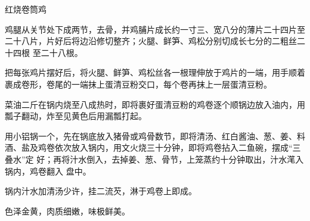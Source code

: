 %
%
%
%
%
%
%
\begin{recipe}{红烧卷筒鸡}

\ingredients


\preparation

\step 鸡腿从关节处下成两节，去骨，并鸡脯片成长约一寸三、宽八分的薄片二十四片至
二十八片，片好后将边沿修切整齐；火腿、鲜笋、鸡松分别切成长七分的二粗丝二十四根
至二十八根。

\step 把每张鸡片摆好后，将火腿、鲜笋、鸡松丝各一根理伸放于鸡片的一端，用手顺着
裹成卷形，卷尾的一端抹上蛋清豆粉交口，每个卷再抹上一层蛋清豆粉。

\step 菜油二斤在锅内烧至八成热时，即将裹好蛋清豆粉的鸡卷逐个顺锅边放入油内，用
瓢子翻动，炸至见黄色后用漏瓢打起。

\step 用小铝锅一个，先在锅底放入猪骨或鸡骨数节，即将清汤、红白酱油、葱、姜、料
酒、盐及鸡卷依次放入锅内，用文火烧三十分钟，即将鸡卷拈入二鱼碗，摆成“三叠水”定
好；再将汁水倒入，去掉姜、葱、骨节，上笼蒸约十分钟取出，汁水滗入锅内，鸡卷翻入
盘中。

\step 锅内汁水加清汤少许，挂二流芡，淋于鸡卷上即成。

\features

色泽金黄，肉质细嫩，味极鲜美。

\end{recipe}

